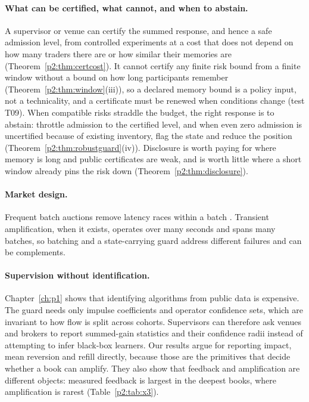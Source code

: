 \paragraph{What can be certified, what cannot, and when to abstain.} A supervisor or venue can certify the summed response, and hence a safe admission level, from controlled experiments at a cost that does not depend on how many traders there are or how similar their memories are (Theorem~\ref{p2:thm:certcost}). It cannot certify any finite risk bound from a finite window without a bound on how long participants remember (Theorem~\ref{p2:thm:window}(iii)), so a declared memory bound is a policy input, not a technicality, and a certificate must be renewed when conditions change (test T09). When compatible risks straddle the budget, the right response is to abstain: throttle admission to the certified level, and when even zero admission is uncertified because of existing inventory, flag the state and reduce the position (Theorem~\ref{p2:thm:robustguard}(iv)). Disclosure is worth paying for where memory is long and public certificates are weak, and is worth little where a short window already pins the risk down (Theorem~\ref{p2:thm:disclosure}).

\paragraph{Market design.} Frequent batch auctions remove latency races within a batch \citep{p2:budish2015}. Transient amplification, when it exists, operates over many seconds and spans many batches, so batching and a state-carrying guard address different failures and can be complements.

\paragraph{Supervision without identification.} Chapter~\ref{ch:p1} shows that identifying algorithms from public data is expensive. The guard needs only impulse coefficients and operator confidence sets, which are invariant to how flow is split across cohorts. Supervisors can therefore ask venues and brokers to report summed-gain statistics and their confidence radii instead of attempting to infer black-box learners. Our results argue for reporting impact, mean reversion and refill directly, because those are the primitives that decide whether a book can amplify. They also show that feedback and amplification are different objects: measured feedback is largest in the deepest books, where amplification is rarest (Table~\ref{p2:tab:x3}).

